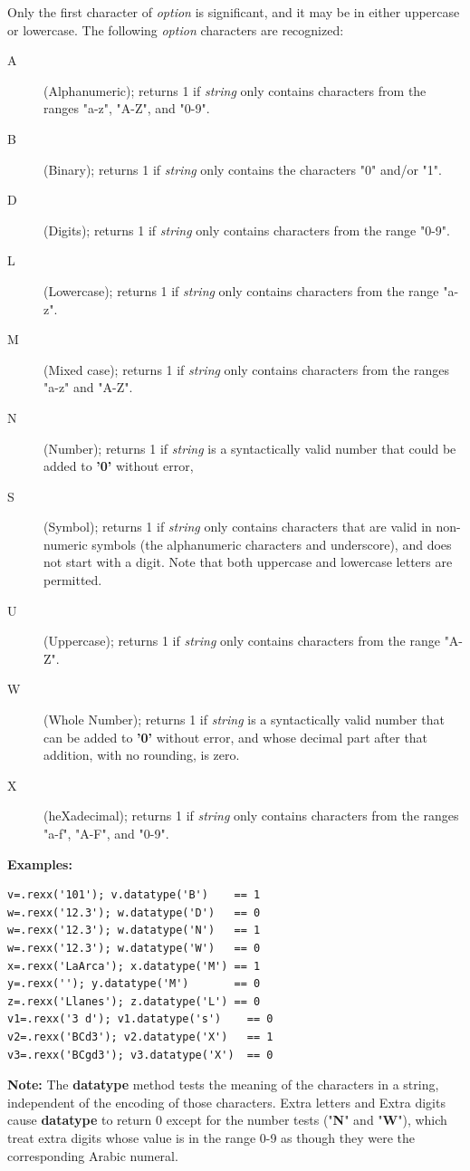 Only the first character of \emph{option} is significant, and it may
be in either uppercase or lowercase.
The following \emph{option} characters are recognized:
\begin{description}
\item[A]\label{refdta}
(Alphanumeric); returns 1 if \emph{string} only contains
characters from the ranges "a-z", "A-Z", and "0-9".
\item[B]\label{refdtb}
(Binary); returns 1 if \emph{string} only contains the
characters "0" and/or "1".
\item[D]\label{refdtd}
(Digits); returns 1 if \emph{string} only contains
characters from the range "0-9".
\item[L]\label{refdtl}
(Lowercase); returns 1 if \emph{string} only contains
characters from the range "a-z".
\item[M]\label{refdtm}
(Mixed case); returns 1 if \emph{string} only contains
characters from the ranges "a-z" and "A-Z".
\item[N]\label{refdtn}
(Number); returns 1 if \emph{string} is a syntactically valid
\crexx{} number that could be added to \textbf{'0'} without error,
\item[S]\label{refdts}
(Symbol); returns 1 if \emph{string} only contains characters
that are valid in non-numeric symbols (the alphanumeric characters and
underscore), and does not start with a digit.  Note that both uppercase
and lowercase letters are permitted.
\item[U]\label{refdtu}
(Uppercase); returns 1 if \emph{string} only contains
characters from the range "A-Z".
\item[W]\label{refdtw}
(Whole Number); returns 1 if \emph{string} is a syntactically valid
\crexx{} number that can be added to \textbf{'0'} without error, and
whose decimal part after that addition, with no rounding, is zero.
\item[X]\label{refdtx}
(heXadecimal); returns 1 if \emph{string} only contains
characters from the ranges "a-f", "A-F", and "0-9".
\end{description}
 
\textbf{Examples:}
\begin{lstlisting}
v=.rexx('101'); v.datatype('B')    == 1
w=.rexx('12.3'); w.datatype('D')   == 0
w=.rexx('12.3'); w.datatype('N')   == 1
w=.rexx('12.3'); w.datatype('W')   == 0
x=.rexx('LaArca'); x.datatype('M') == 1
y=.rexx(''); y.datatype('M')       == 0
z=.rexx('Llanes'); z.datatype('L') == 0
v1=.rexx('3 d'); v1.datatype('s')    == 0
v2=.rexx('BCd3'); v2.datatype('X')   == 1
v3=.rexx('BCgd3'); v3.datatype('X')  == 0
\end{lstlisting}
\textbf{Note: }The \textbf{datatype} method tests the meaning of the characters
in a string, independent of the encoding of those characters.  Extra
letters and Extra digits cause \textbf{datatype} to return 0 except
for the number tests ("\textbf{N}" and "\textbf{W}"),
which treat extra digits whose value is in the range 0-9 as though they
were the corresponding Arabic numeral.
